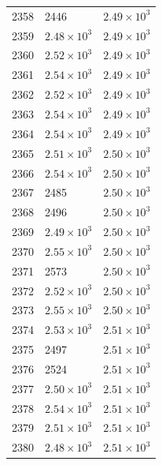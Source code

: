 \begin{table}[H]
\begin{tabular}{lll}
2358 & 2446 & $\displaystyle 2.49 \times 10^{3}$ \\
2359 & $\displaystyle 2.48 \times 10^{3}$ & $\displaystyle 2.49 \times 10^{3}$ \\
2360 & $\displaystyle 2.52 \times 10^{3}$ & $\displaystyle 2.49 \times 10^{3}$ \\
2361 & $\displaystyle 2.54 \times 10^{3}$ & $\displaystyle 2.49 \times 10^{3}$ \\
2362 & $\displaystyle 2.52 \times 10^{3}$ & $\displaystyle 2.49 \times 10^{3}$ \\
2363 & $\displaystyle 2.54 \times 10^{3}$ & $\displaystyle 2.49 \times 10^{3}$ \\
2364 & $\displaystyle 2.54 \times 10^{3}$ & $\displaystyle 2.49 \times 10^{3}$ \\
2365 & $\displaystyle 2.51 \times 10^{3}$ & $\displaystyle 2.50 \times 10^{3}$ \\
2366 & $\displaystyle 2.54 \times 10^{3}$ & $\displaystyle 2.50 \times 10^{3}$ \\
2367 & 2485 & $\displaystyle 2.50 \times 10^{3}$ \\
2368 & 2496 & $\displaystyle 2.50 \times 10^{3}$ \\
2369 & $\displaystyle 2.49 \times 10^{3}$ & $\displaystyle 2.50 \times 10^{3}$ \\
2370 & $\displaystyle 2.55 \times 10^{3}$ & $\displaystyle 2.50 \times 10^{3}$ \\
2371 & 2573 & $\displaystyle 2.50 \times 10^{3}$ \\
2372 & $\displaystyle 2.52 \times 10^{3}$ & $\displaystyle 2.50 \times 10^{3}$ \\
2373 & $\displaystyle 2.55 \times 10^{3}$ & $\displaystyle 2.50 \times 10^{3}$ \\
2374 & $\displaystyle 2.53 \times 10^{3}$ & $\displaystyle 2.51 \times 10^{3}$ \\
2375 & 2497 & $\displaystyle 2.51 \times 10^{3}$ \\
2376 & 2524 & $\displaystyle 2.51 \times 10^{3}$ \\
2377 & $\displaystyle 2.50 \times 10^{3}$ & $\displaystyle 2.51 \times 10^{3}$ \\
2378 & $\displaystyle 2.54 \times 10^{3}$ & $\displaystyle 2.51 \times 10^{3}$ \\
2379 & $\displaystyle 2.51 \times 10^{3}$ & $\displaystyle 2.51 \times 10^{3}$ \\
2380 & $\displaystyle 2.48 \times 10^{3}$ & $\displaystyle 2.51 \times 10^{3}$ \\

\end{tabular}
\end{table}
